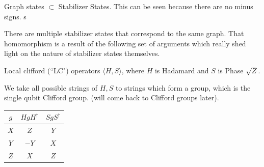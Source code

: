 \begin{fact}
    Graph states $\subset$ Stabilizer States. This can be seen because there are no minus signs. s
\end{fact}
There are multiple stabilizer states that correspond to the same graph. That homomorphism is a result of the following set of arguments which really shed light on the nature of stabilizer states themselves. 

\begin{definition}
    Local clifford (``LC") operators $\langle H, S \rangle$, where $H$ is Hadamard and $S$ is Phase $\sqrt{Z}$. 
\end{definition}
We take all possible strings of $H,S$ to strings which form a group, which is the single qubit Clifford group. (will come back to Clifford groups later). 
\begin{center}
    \begin{tabular}{c|c|c}
         $g$ & $HgH^\dagger$ & $SgS^\dagger$ \\
         \hline
         $X$ & $Z$ & $Y$ \\
         $Y$ & $-Y$ & $X$ \\
         $Z$ & $X$ & $Z$  
    \end{tabular}
\end{center}

